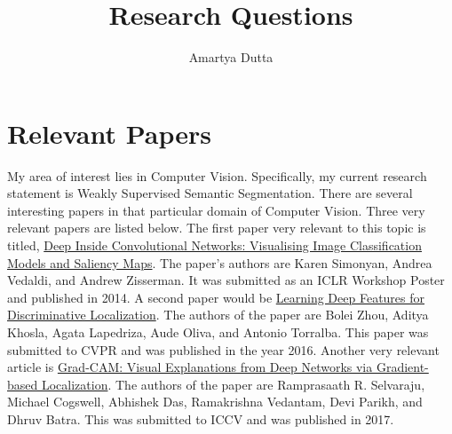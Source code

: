 \documentclass[11pt]{article}
\title{\textbf{Research Questions}}
\author{Amartya Dutta}
\date{}
\begin{document}
\clearpage\maketitle
\thispagestyle{empty}

\section{Relevant Papers}

My area of interest lies in Computer Vision. Specifically, my current research statement is Weakly Supervised Semantic Segmentation. There are several interesting papers in that particular domain of Computer Vision. Three very relevant papers are listed below. \newline
The first paper very relevant to this topic is titled, \href{https://arxiv.org/abs/1312.6034}{Deep Inside Convolutional Networks: Visualising Image Classification Models and Saliency Maps}. The paper's authors are Karen Simonyan, Andrea Vedaldi, and Andrew Zisserman. It was submitted as an ICLR Workshop Poster and published in 2014. \newline
A second paper would be \href{https://arxiv.org/abs/1512.04150}{Learning Deep Features for Discriminative Localization}. The authors of the paper are Bolei Zhou, Aditya Khosla, Agata Lapedriza, Aude Oliva, and Antonio Torralba. This paper was submitted to CVPR and was published in the year 2016. \newline
Another very relevant article is \href{https://arxiv.org/abs/1610.02391}{Grad-CAM: Visual Explanations from Deep Networks via Gradient-based Localization}. The authors of the paper are Ramprasaath R. Selvaraju, Michael Cogswell, Abhishek Das, Ramakrishna Vedantam, Devi Parikh, and Dhruv Batra. This was submitted to ICCV and was published in 2017.
\end{document}
